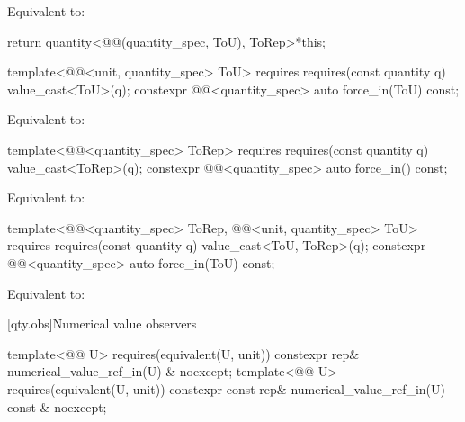 \begin{itemdescr}
\pnum
\effects
Equivalent to:
\begin{codeblock}
return quantity<@@(quantity_spec, ToU{}), ToRep>{*this};
\end{codeblock}
\end{itemdescr}

\begin{itemdecl}
template<@@<unit, quantity_spec> ToU>
  requires requires(const quantity q) { value_cast<ToU{}>(q); }
constexpr @@<quantity_spec> auto force_in(ToU) const;
\end{itemdecl}

\begin{itemdescr}
\pnum
\effects
Equivalent to:
\end{itemdescr}

\begin{itemdecl}
template<@@<quantity_spec> ToRep>
  requires requires(const quantity q) { value_cast<ToRep>(q); }
constexpr @@<quantity_spec> auto force_in() const;
\end{itemdecl}

\begin{itemdescr}
\pnum
\effects
Equivalent to:
\end{itemdescr}

\begin{itemdecl}
template<@@<quantity_spec> ToRep,
         @@<unit, quantity_spec> ToU>
  requires requires(const quantity q) { value_cast<ToU{}, ToRep>(q); }
constexpr @@<quantity_spec> auto force_in(ToU) const;
\end{itemdecl}

\begin{itemdescr}
\pnum
\effects
Equivalent to:
\end{itemdescr}

[qty.obs]{Numerical value observers}

\begin{itemdecl}
template<@@ U>
  requires(equivalent(U{}, unit))
constexpr rep& numerical_value_ref_in(U) & noexcept;
template<@@ U>
  requires(equivalent(U{}, unit))
constexpr const rep& numerical_value_ref_in(U) const & noexcept;
\end{itemdecl}

